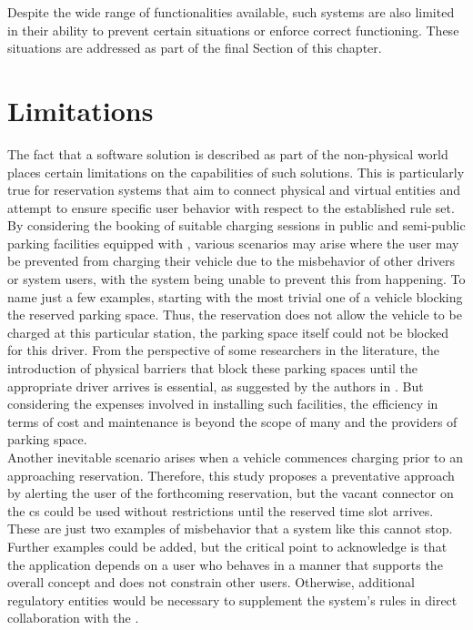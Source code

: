 \noindent Despite the wide range of functionalities available, such systems are also limited in their ability to prevent certain situations or enforce correct functioning. These situations are addressed as part of the final Section of this chapter.

\section{Limitations}
\label{ch:Analysis and Validation:sec:Limitations}

The fact that a software solution is described as part of the non-physical world places certain limitations on the capabilities of such solutions. This is particularly true for reservation systems that aim to connect physical and virtual entities and attempt to ensure specific user behavior with respect to the established rule set.
By considering the booking of suitable charging sessions in public and semi-public parking facilities equipped with , various scenarios may arise where the user may be prevented from charging their vehicle due to the misbehavior of other drivers or system users, with the system being unable to prevent this from happening.
To name just a few examples, starting with the most trivial one of a vehicle blocking the reserved parking space. Thus, the reservation does not allow the vehicle to be charged at this particular station, the parking space itself could not be blocked for this driver.
From the perspective of some researchers in the literature, the introduction of physical barriers that block these parking spaces until the appropriate driver arrives is essential, as suggested by the authors in \cite{basmadjian_reference_2020}.
But considering the expenses involved in installing such facilities, the efficiency in terms of cost and maintenance is beyond the scope of many  and the providers of parking space. \\
Another inevitable scenario arises when a vehicle commences charging prior to an approaching reservation. Therefore, this study proposes a preventative approach by alerting the user of the forthcoming reservation, but the vacant connector on the \acrshort{cs} could be used without restrictions until the reserved time slot arrives.
These are just two examples of misbehavior that a system like this cannot stop. Further examples could be added, but the critical point to acknowledge is that the application depends on a user who behaves in a manner that supports the overall concept and does not constrain other users.
Otherwise, additional regulatory entities would be necessary to supplement the system's rules in direct collaboration with the .
